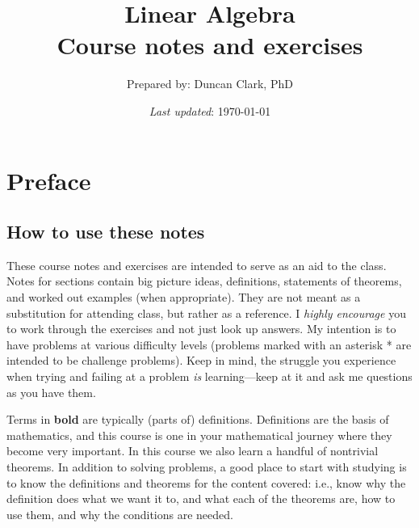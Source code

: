 \documentclass[12pt]{article}
\numberwithin{equation}{subsection}
\numberwithin{figure}{subsection}
\theoremstyle{note}
\begin{document}
\title{ \textbf{Linear Algebra \\ Course notes and exercises}}
\author{\small Prepared by: Duncan Clark, PhD}
\date{\small 
\textit{Last updated}: \today}
\maketitle 


\tableofcontents 


\newpage

\section{Preface}


\subsection{How to use these notes} These course notes and exercises are intended to serve as an aid to the class. Notes for sections contain big picture ideas, definitions, statements of theorems, and worked out examples (when appropriate). They are not meant as a substitution for attending class, but rather as a reference. I \textit{highly encourage} you to work through the exercises and not just look up answers. My intention is to have problems at various difficulty levels (problems marked with an asterisk * are intended to be challenge problems). Keep in mind, the struggle you experience when trying and failing at a problem \textit{is} learning---keep at it and ask me questions as you have them. 

Terms in \textbf{bold} are typically (parts of) definitions. Definitions are the basis of mathematics, and this course is one in your mathematical journey where they become very important. In this course we also learn a handful of nontrivial theorems. In addition to solving problems, a good place to start with studying is to know the definitions and theorems for the content covered: i.e., know why the definition does what we want it to, and  what each of the theorems are, how to use them, and why the conditions are needed.
\end{document}
